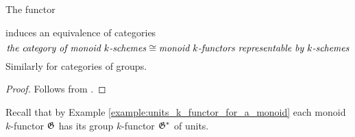 \begin{corollary}\label{corollary:monoid_k_schemes_and_their_functors_of_points}
The functor
\begin{center}
\end{center}
induces an equivalence of categories
$$\mbox{\emph{the category of monoid $k$-schemes}}\cong \mbox{\emph{monoid $k$-functors representable by $k$-schemes}}$$
Similarly for categories of groups.
\end{corollary}
\begin{proof}
Follows from {\cite[Fact 4.1]{kfunctors}}.
\end{proof}
\noindent
Recall that by Example \ref{example:units_k_functor_for_a_monoid} each monoid $k$-functor ${\mathfrak G}$ has its group $k$-functor ${\mathfrak G}^*$ of units.

